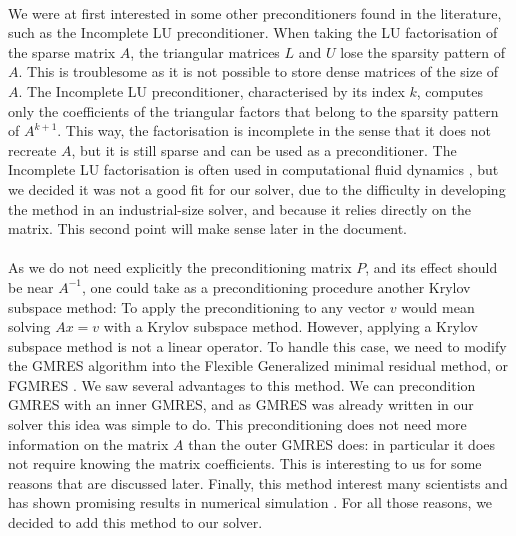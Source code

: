       \paragraph{}
      We were at first interested in some other preconditioners found in the literature, such as the Incomplete LU preconditioner.
      When taking the LU factorisation of the sparse matrix $A$, the triangular matrices $L$ and $U$ lose the sparsity pattern of $A$.
      This is troublesome as it is not possible to store dense matrices of the size of $A$.
      The Incomplete LU preconditioner, characterised by its index $k$, computes only the coefficients of the triangular factors that belong to the sparsity pattern of $A^{k+1}$.
      This way, the factorisation is incomplete in the sense that it does not recreate $A$, but it is still sparse and can be used as a preconditioner.
      The Incomplete LU factorisation is often used in computational fluid dynamics \cite{LiuZhangZhongEtAl2015, AhrabiMavriplis2020}, but we decided it was not a good fit for our solver, due to the difficulty in developing the method in an industrial-size solver, and because it relies directly on the matrix.
      This second point will make sense later in the document.

      \paragraph{}
      As we do not need explicitly the preconditioning matrix $P$, and its effect should be near $A^{-1}$, one could take as a preconditioning procedure another Krylov subspace method:
      To apply the preconditioning to any vector $v$ would mean solving $Ax = v$ with a Krylov subspace method.
      However, applying a Krylov subspace method is not a linear operator.
      To handle this case, we need to modify the GMRES algorithm into the Flexible Generalized minimal residual method, or FGMRES \cite{Saad1993, SimonciniSzyld2002}.
      We saw several advantages to this method.
      We can precondition GMRES with an inner GMRES, and as GMRES was already written in our solver this idea was simple to do.
      This preconditioning does not need more information on the matrix $A$ than the outer GMRES does: in particular it does not require knowing the matrix coefficients.
      This is interesting to us for some reasons that are discussed later.
      Finally, this method interest many scientists \cite{CoulaudGiraudRametEtAl2013, Vasseur2016} and has shown promising results in numerical simulation \cite{Pinel2010}.
      For all those reasons, we decided to add this method to our solver.

